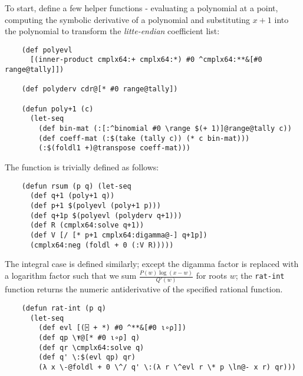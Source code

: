 To start, define a few helper functions - evaluating a polynomial at a point, computing the symbolic derivative of a polynomial and substituting $x+1$ into the polynomial to transform the \textit{litte-endian} coefficient list:

\begin{Verbatim}
    (def polyevl
      [(inner-product cmplx64:+ cmplx64:*) #0 ^cmplx64:**&[#0 range@tally]])

    (def polyderv cdr@[* #0 range@tally])

    (defun poly+1 (c)
      (let-seq
        (def bin-mat (:[:^binomial #0 \range $(+ 1)]@range@tally c))
        (def coeff-mat (:$(take (tally c)) (* c bin-mat)))
        (:$(foldl1 +)@transpose coeff-mat)))
\end{Verbatim}

The function is trivially defined as follows:

\begin{Verbatim}
    (defun rsum (p q) (let-seq
      (def q+1 (poly+1 q))
      (def p+1 $(polyevl (poly+1 p)))
      (def q+1p $(polyevl (polyderv q+1)))
      (def R (cmplx64:solve q+1))
      (def V [/ [* p+1 cmplx64:digamma@-] q+1p])
      (cmplx64:neg (foldl + 0 (:V R)))))
\end{Verbatim}

The integral case is defined similarly; except the digamma factor is replaced with a logarithm factor such that we sum $\displaystyle \frac{P(w) \log(x-w)}{Q'(w)}$ for roots $w$; the \verb|rat-int| function returns the numeric antiderivative of the specified rational function. 

\begin{Verbatim}
    (defun rat-int (p q)
      (let-seq
        (def evl [(⌻ + *) #0 ^**&[#0 ⍳∘⍴]])
        (def qp \⍕@[* #0 ⍳∘⍴] q)
        (def qr \cmplx64:solve q)
        (def q' \:$(evl qp) qr)
        (λ x \-@foldl + 0 \^/ q' \:(λ r \^evl r \* p \ln@- x r) qr)))
\end{Verbatim}

